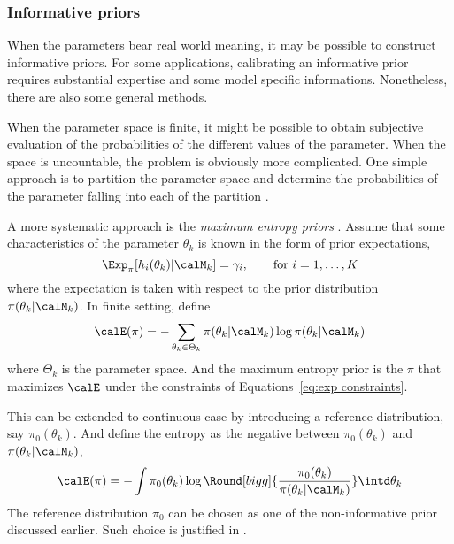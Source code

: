 

\subsubsection{Informative priors}
\label{ssub:Informative priors}

When the parameters bear real world meaning, it may be possible to construct
informative priors. For some applications, calibrating an informative prior
requires substantial expertise and some model specific informations.
Nonetheless, there are also some general methods.

When the parameter space is finite, it might be possible to obtain subjective
evaluation of the probabilities of the different values of the parameter. When
the space is uncountable, the problem is obviously more complicated. One
simple approach is to partition the parameter space and determine the
probabilities of the parameter falling into each of the partition
\cite[][sec.~3.2.2]{Robert:2007tc}.

A more systematic approach is the \emph{maximum entropy priors}
\cite{Jaynes:1989vx}. Assume that some characteristics of the parameter
$\theta_k$ is known in the form of prior expectations,
\begin{equation}
  \Exp_{\pi}[h_i(\theta_k)|\calM_k] = \gamma_i, \qquad\text{for } i =
  1,\dots,K
  \label{eq:exp constraints}
\end{equation}
where the expectation is taken with respect to the prior distribution
$\pi(\theta_k|\calM_k)$. In finite setting, define
\begin{equation}
  \calE(\pi) = -\sum_{\theta_k\in\Theta_k}
  \pi(\theta_k|\calM_k)\log \pi (\theta_k|\calM_k)
\end{equation}
where $\Theta_k$ is the parameter space. And the maximum entropy prior is the
$\pi$ that maximizes $\calE$ under the constraints of Equations~\eqref{eq:exp
  constraints}.

This can be extended to continuous case by introducing a reference
distribution, say $\pi_0(\theta_k)$. And define the entropy as the negative
\kld between $\pi_0(\theta_k)$ and $\pi(\theta_k|\calM_k)$,
\begin{equation}
  \calE(\pi) = -\int \pi_0(\theta_k)\log\Round[bigg]{
    \frac{\pi_0(\theta_k)}{\pi(\theta_k|\calM_k)}}\intd\theta_k
\end{equation}
The reference distribution $\pi_0$ can be chosen as one of the non-informative
prior discussed earlier. Such choice is justified in
\cite[][chap.~9]{Robert:2007tc}.

